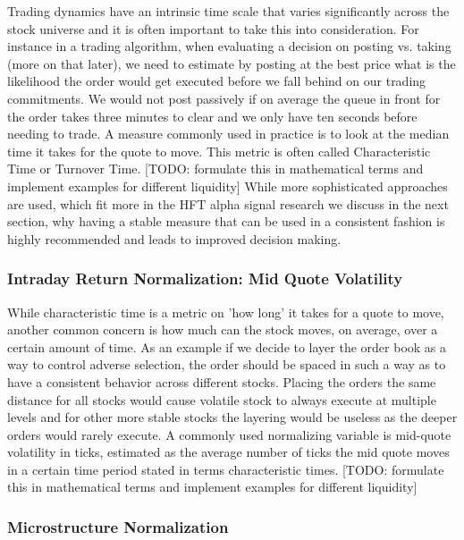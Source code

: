 Trading dynamics have an intrinsic time scale that varies significantly across the stock universe and it is often important to take this into consideration. For instance in a trading algorithm, when evaluating a decision on posting vs. taking (more on that later), we need to estimate by posting at the best price what is the likelihood the order would get executed before we fall behind on our trading commitments. We would not post passively if on average the queue in front for the order takes three minutes to clear and we only have ten seconds before needing to trade. A measure commonly used in practice is to look at the median time it takes for the quote to move. This metric is often called Characteristic Time or Turnover Time. [TODO: formulate this in mathematical terms and implement examples for different liquidity] While more sophisticated approaches are used, which fit more in the HFT alpha signal research we discuss in the next section, why having a stable measure that can be used in a consistent fashion is highly recommended and leads to improved decision making.


\subsubsection{Intraday Return Normalization: Mid Quote Volatility}

While characteristic time is a metric on 'how long' it takes for a quote to move, another common concern is how much can the stock moves, on average, over a certain amount of time. As an example if we decide to layer the order book as a way to control adverse selection, the order should be spaced in such a way as to have a consistent behavior across different stocks. Placing the orders the same distance for all stocks would cause volatile stock to always execute at multiple levels and for other more stable stocks the layering would be useless as the deeper orders would rarely execute. A commonly used normalizing variable is mid-quote volatility in ticks, estimated as the average number of ticks the mid quote moves in a certain time period stated in terms characteristic times. [TODO: formulate this in mathematical terms and implement examples for different liquidity] 


\subsubsection{Microstructure Normalization}

